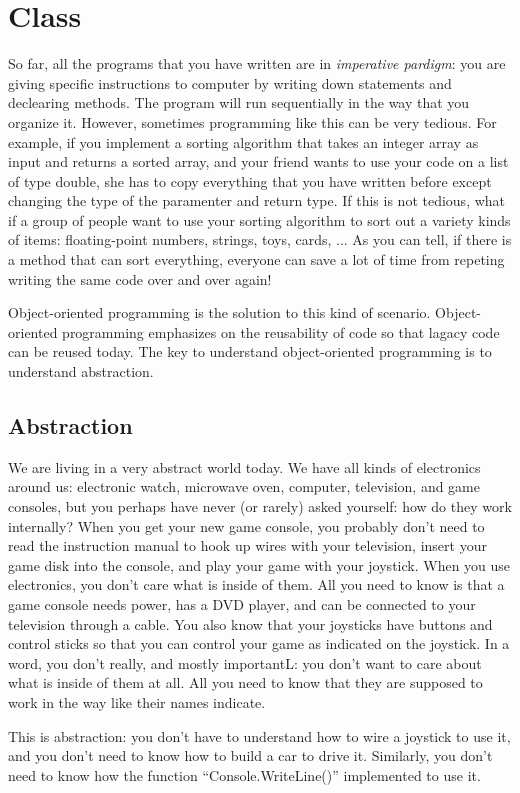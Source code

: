 \documentclass[../main.tex]{subfiles}
\begin{document}
\section{Class}
So far, all the programs that you have written are in \emph{imperative pardigm}:
you are giving specific instructions to computer by writing down statements
and declearing methods. The program will run sequentially in the way that you
organize it. However, sometimes programming like this can be very tedious. For
example, if you implement a sorting algorithm that takes an integer array as
input and returns a sorted array, and your friend wants to use your code on a
list of type double, she has to copy everything that you have written before
except changing the type of the paramenter and return type. If this is not tedious,
what if a group of people want to use your sorting algorithm to sort out a variety
kinds of items: floating-point numbers, strings, toys, cards, ... As you can tell,
if there is a method that can sort everything, everyone can save a lot of time
from repeting writing the same code over and over again!

Object-oriented programming is the solution to this kind of scenario. Object-oriented
programming emphasizes on the reusability of code so that lagacy code can be reused
today. The key to understand object-oriented programming is to understand abstraction.

\subsection{Abstraction}
We are living in a very abstract world today. We have all kinds of electronics
around us: electronic watch, microwave oven, computer, television, and game consoles,
but you perhaps have never (or rarely) asked yourself: how do they work internally?
When you get your new game console, you probably don't need to read the instruction
manual to hook up wires with your television, insert your game disk into the console,
and play your game with your joystick. When you use electronics, you don't care
what is inside of them. All you need to know is that a game console needs power,
has a DVD player, and can be connected to your television through a cable. You also
know that your joysticks have buttons and control sticks so that you can control
your game as indicated on the joystick. In a word, you don't really, and mostly
importantL: you don't want to care about what is inside of them at all. All you
need to know that they are supposed to work in the way like their names indicate.

This is abstraction: you don't have to understand how to wire a joystick to use
it, and you don't need to know how to build a car to drive it. Similarly, you
don't need to know how the function ``Console.WriteLine()'' implemented to use it.
\end{document}
